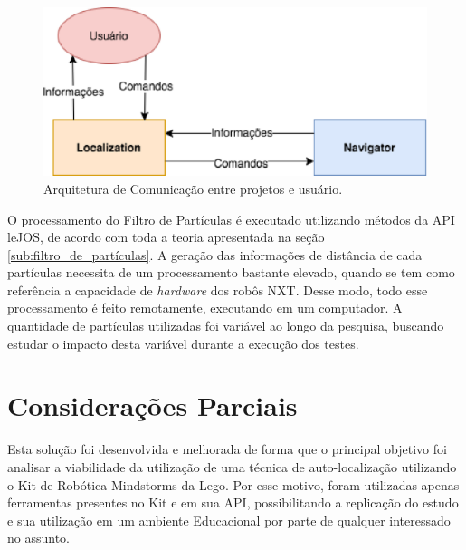 	\begin{figure}[H]
		\centering
		\includegraphics[scale=0.8]{figuras/arq_pc.eps}
		\caption[Arquitetura de Comunicação]{Arquitetura de Comunicação entre projetos e usuário.}
		\label{img:arq_pc}
	\end{figure}

O processamento do Filtro de Partículas é executado utilizando métodos da API leJOS, de acordo com toda a teoria apresentada na seção
\ref{sub:filtro_de_partículas}. A geração das informações de distância de cada partículas necessita de um processamento bastante elevado,
quando se tem como referência a capacidade de \textit{hardware} dos robôs NXT. Desse modo, todo esse processamento é feito remotamente,
executando em um computador. A quantidade de partículas utilizadas foi variável ao longo da pesquisa, buscando estudar o impacto desta variável
durante a execução dos testes.

\section{Considerações Parciais}

Esta solução foi desenvolvida e melhorada de forma que o principal objetivo foi analisar a viabilidade da utilização de uma técnica
de auto-localização utilizando o Kit de Robótica Mindstorms da Lego. Por esse motivo, foram utilizadas apenas ferramentas presentes no Kit
e em sua API, possibilitando a replicação do estudo e sua utilização em um ambiente Educacional por parte de qualquer interessado no assunto.
